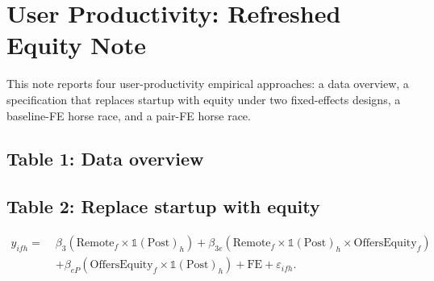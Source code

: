 \documentclass{article}
\newcommand{\cleanedresultsdir}{../../results/cleaned/tex}
\newcommand{\TableInput}[2][\linewidth]{}
\newcommand{\FloatNote}[1]{%
  \begingroup
    \captionsetup{style=noteflush}%
    \caption*{\textit{Notes:}~#1}%
  \endgroup
}
\begin{document}
\section*{User Productivity: Refreshed Equity Note}

\noindent This note reports four user-productivity empirical approaches: a data overview, a specification that replaces startup with equity under two fixed-effects designs, a baseline-FE horse race, and a pair-FE horse race.

\subsection*{Table 1: Data overview}
\begin{table}[H]
  \centering
  \caption{User-productivity analysis universe and equity signal support}
  \TableInput{\cleanedresultsdir/llm_equity_user_refresh_data_overview.tex}
  \FloatNote{Panel A summarizes the user-productivity analysis universe. ``Firm$\times$half-year cells'' and ``Firms'' are the corresponding collapsed counts. Panel B summarizes the supporting equity signal on the same firm universe. ``Firms offering equity'' means a firm has at least one half-year with a positive equity-offer signal anywhere in the panel. Posting counts are sums over the same firm universe, using the backfill convention that firm$\times$half-year cells with no keyword-hit postings carry zero equity signal.}
\end{table}

\subsection*{Table 2: Replace startup with equity}
\[
  \begin{aligned}
    y_{ifh} =\; & \beta_3 \left( \text{Remote}_f \times \mathds{1}(\text{Post})_h \right)
    + \beta_{3e} \left( \text{Remote}_f \times \mathds{1}(\text{Post})_h \times \text{OffersEquity}_f \right) \\
    & + \beta_{eP} \left( \text{OffersEquity}_f \times \mathds{1}(\text{Post})_h \right)
    + \text{FE} + \varepsilon_{ifh}.
  \end{aligned}
\]
\begin{table}[H]
  \centering
  \caption{User productivity: replace startup with equity}
  \TableInput{\cleanedresultsdir/llm_equity_user_refresh_replace_startup_equity.tex}
  \FloatNote{Columns (1)-(2) use individual, firm, and half-year fixed effects. Columns (3)-(4) use firm$\times$individual and half-year fixed effects. The row $\text{Remote}\times\mathds{1}(\text{Post})$ is the post remote effect for firms without an equity signal. The interaction row $\text{Remote}\times\mathds{1}(\text{Post})\times\text{Offers equity}$ is the incremental post remote effect for firms that do offer equity. The row $\text{Offers equity}\times\mathds{1}(\text{Post})$ is an additional post-period level shift for equity firms. Standard errors are clustered by worker and reported in parentheses; *, **, *** denote $p<0.10, 0.05, 0.01$.}
\end{table}
\end{document}
